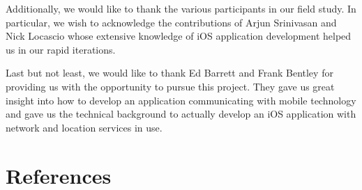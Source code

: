 \documentclass{sigchi}
\begin{document}
Additionally, we would like to thank the various participants in our field study. In particular, we wish to acknowledge the contributions of Arjun Srinivasan and Nick Locascio whose extensive knowledge of iOS application development helped us in our rapid iterations. 

Last but not least, we would like to thank Ed Barrett and Frank Bentley for providing us with the opportunity to pursue this project. They gave us great insight into how to develop an
application communicating with mobile technology and gave us the technical background to actually develop an iOS application with network and location services in use. 

%
%
%
%
%
\balance

\section{References}



\end{document}
